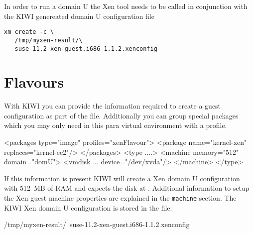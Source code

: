 In order to run a domain U the Xen tool  needs to be called
in conjunction with the KIWI genereated domain U configuration file

\begin{Command}{13cm}
\begin{verbatim}
xm create -c \
   /tmp/myxen-result/\
   suse-11.2-xen-guest.i686-1.1.2.xenconfig
\end{verbatim}
\end{Command}

\section{Flavours}

With KIWI you can provide the information
required to create a guest configuration as part of the 
file. Additionally you can group special packages which you may only
need in this para virtual environment with a profile.

\begin{xml}
<packages type="image" profiles="xenFlavour">
   <package name="kernel-xen" replaces="kernel-ec2"/>
</packages>
<type ....>
   <machine memory="512" domain="domU">
      <vmdisk ... device="/dev/xvda"/>
   </machine>
</type>
\end{xml}

If this information is present KIWI will create a Xen domain U
configuration with 512~MB of RAM and expects the disk at .
Additional information to setup the Xen guest machine properties are
explained in the \texttt{machine} section. The KIWI Xen domain U
configuration is stored in the file:

\begin{Command}{13cm}
/tmp/myxen-result/\
    suse-11.2-xen-guest.i686-1.1.2.xenconfig
\end{Command}



